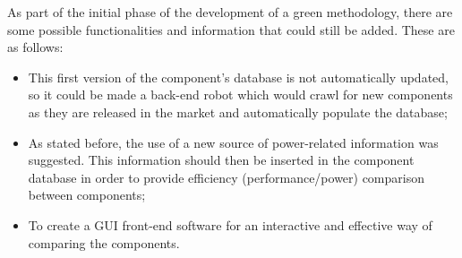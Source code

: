         As part of the initial phase of the development of a green methodology, there are some possible functionalities and information that could still be added. These are as follows:
    \begin{itemize}
	    \item This first version of the component's database is not automatically updated, so it could be made a back-end robot which would crawl for new components as they are released in the market and automatically populate the database;
	    \item As stated before, the use of a new source of power-related information was suggested. This information should then be inserted in the component database in order to provide efficiency (performance/power) comparison between components;
	    \item To create a GUI front-end software for an interactive and effective way of comparing the components.

    \end{itemize}







